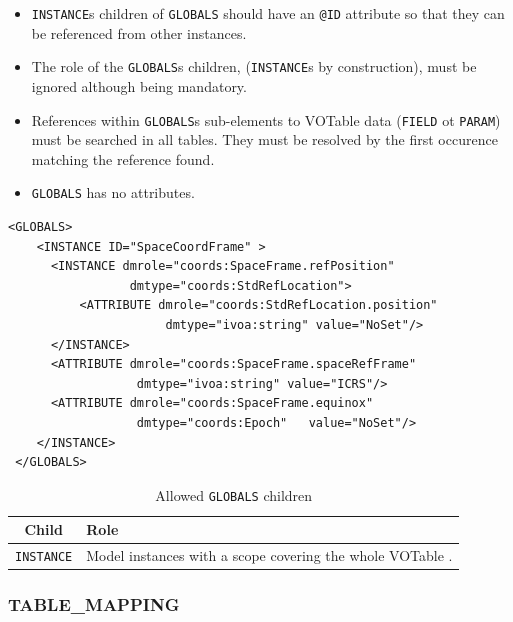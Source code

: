 \documentclass[11pt,a4paper]{ivoa}
\begin{document}
\begin{itemize}
    \item \texttt{INSTANCE}s children of \texttt{GLOBALS} should have an  \texttt{@ID} attribute so that they can be referenced from other instances.
    \item The role of the \texttt{GLOBALS}s children, (\texttt{INSTANCE}s by construction), must be ignored although being mandatory.
    \item References within \texttt{GLOBALS}s  sub-elements to VOTable data (\texttt{FIELD} ot \texttt{PARAM}) must be searched in all tables. 
            They must be resolved by the first occurence matching the reference found.
    \item \texttt{GLOBALS} has no attributes. 
\end{itemize}

\begin{lstlisting}[caption={GLOBALS block example},style=XML]
  <GLOBALS>
    <INSTANCE ID="SpaceCoordFrame" >
      <INSTANCE dmrole="coords:SpaceFrame.refPosition" 
                 dmtype="coords:StdRefLocation">
          <ATTRIBUTE dmrole="coords:StdRefLocation.position" 
                      dmtype="ivoa:string" value="NoSet"/>
      </INSTANCE>
      <ATTRIBUTE dmrole="coords:SpaceFrame.spaceRefFrame" 
                  dmtype="ivoa:string" value="ICRS"/>
      <ATTRIBUTE dmrole="coords:SpaceFrame.equinox" 
                  dmtype="coords:Epoch"   value="NoSet"/>
    </INSTANCE>
 </GLOBALS>
\end{lstlisting}




\begin{table}[!htbp]
\small
\centering
\begin{tabulary}{\linewidth}{|c|J|}       
       \hline 
           \textbf{Child} &  
           \textbf{Role}\\
       \hline         \hline  
            \texttt{INSTANCE}    &  
            Model instances with a scope covering the whole VOTable . \\       
       \hline 
     \end{tabulary}
     \caption{Allowed  \texttt{GLOBALS} children} 
     \label{tbl:globals-children}
 \end{table}

\FloatBarrier
%
%

\subsubsection{TABLE\_MAPPING}
\end{document}
